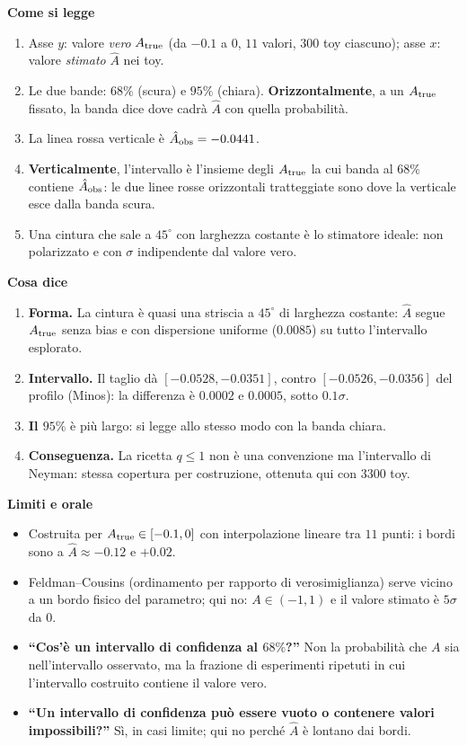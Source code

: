 \documentclass[10.5pt,a4paper]{article}
\newcommand{\sez}[1]{\par\Needspace{6\baselineskip}\medskip\noindent\textbf{\large #1}\par\nopagebreak\smallskip}
\begin{document}
\sez{Come si legge}
\begin{enumerate}
\item Asse $y$: valore \emph{vero} $A_{\rm true}$ (da $-0.1$ a $0$, $11$ valori, $300$ toy ciascuno); asse $x$: valore \emph{stimato} $\hat A$ nei toy.
\item Le due bande: $68\%$ (scura) e $95\%$ (chiara). \textbf{Orizzontalmente}, a un $A_{\rm true}$ fissato, la banda dice dove cadrà $\hat A$ con quella probabilità.
\item La linea rossa verticale è $\hat A_{\rm obs}=-0.0441$.
\item \textbf{Verticalmente}, l'intervallo è l'insieme degli $A_{\rm true}$ la cui banda al $68\%$ contiene $\hat A_{\rm obs}$: le due linee rosse orizzontali tratteggiate sono dove la verticale esce dalla banda scura.
\item Una cintura che sale a $45^\circ$ con larghezza costante è lo stimatore ideale: non polarizzato e con $\sigma$ indipendente dal valore vero.
\end{enumerate}

\sez{Cosa dice}
\begin{enumerate}
\item \textbf{Forma.} La cintura è quasi una striscia a $45^\circ$ di larghezza costante: $\hat A$ segue $A_{\rm true}$ senza bias e con dispersione uniforme ($0.0085$) su tutto l'intervallo esplorato.
\item \textbf{Intervallo.} Il taglio dà $[-0.0528,-0.0351]$, contro $[-0.0526,-0.0356]$ del profilo (Minos): la differenza è $0.0002$ e $0.0005$, sotto $0.1\sigma$.
\item \textbf{Il $95\%$} è più largo: si legge allo stesso modo con la banda chiara.
\item \textbf{Conseguenza.} La ricetta $q\le1$ non è una convenzione ma l'intervallo di Neyman: stessa copertura per costruzione, ottenuta qui con $3300$ toy.
\end{enumerate}

\sez{Limiti e orale}
\begin{itemize}
\item Costruita per $A_{\rm true}\in[-0.1,0]$ con interpolazione lineare tra $11$ punti: i bordi sono a $\hat A\approx-0.12$ e $+0.02$.
\item Feldman--Cousins (ordinamento per rapporto di verosimiglianza) serve vicino a un bordo fisico del parametro; qui no: $A\in(-1,1)$ e il valore stimato è $5\sigma$ da $0$.
\item \textbf{``Cos'è un intervallo di confidenza al $68\%$?''} Non la probabilità che $A$ sia nell'intervallo osservato, ma la frazione di esperimenti ripetuti in cui l'intervallo costruito contiene il valore vero.
\item \textbf{``Un intervallo di confidenza può essere vuoto o contenere valori impossibili?''} Sì, in casi limite; qui no perché $\hat A$ è lontano dai bordi.
\end{itemize}
\end{document}
